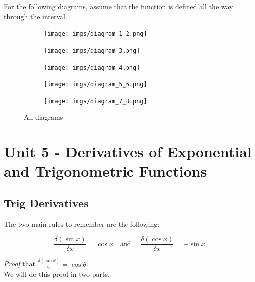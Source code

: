 \documentclass{article}
\begin{document}
For the following diagrams, assume that the function is defined all the way through the interval.
\begin{figure}[ht]
    \centering
    \begin{subfigure}[b]{0.9\textwidth}
        \centering
        \texttt{[image: imgs/diagram\_1\_2.png]}
        \caption{}
    \end{subfigure}
    
    \begin{subfigure}[b]{0.45\textwidth}
        \centering
        \texttt{[image: imgs/diagram\_3.png]}
        \caption{}
    \end{subfigure}
    \hfill
    \begin{subfigure}[b]{0.45\textwidth}
        \centering
        \texttt{[image: imgs/diagram\_4.png]}
        \caption{}
    \end{subfigure}
    
    \begin{subfigure}[b]{0.9\textwidth}
        \centering
        \texttt{[image: imgs/diagram\_5\_6.png]}
        \caption{}
    \end{subfigure}
    
    \begin{subfigure}[b]{0.9\textwidth}
        \centering
        \texttt{[image: imgs/diagram\_7\_8.png]}
        \caption{}
    \end{subfigure}
    
    \caption{All diagrams}
\end{figure}

\clearpage %

\section{Unit 5 - Derivatives of Exponential and Trigonometric Functions}
\subsection{Trig Derivatives}
The two main rules to remember are the following:
\begin{tcolorbox}[sharp corners=uphill,
    colback=purple!50!white,colframe=blue!25!black,coltext=yellow,
    fontupper=\Large\bfseries,arc=6mm,boxrule=2mm,boxsep=5mm]
    $$\frac{\delta (\sin x)}{\delta x}=\cos x \quad \text{and } \quad \frac{\delta(\cos x)}{\delta x}=-\sin x$$
\end{tcolorbox}

\textit{Proof} that $\frac{\delta (\sin \theta)}{\delta x}=\cos \theta$.\\
We will do this proof in two parts. 
\end{document}
